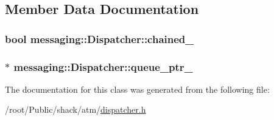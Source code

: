 \subsection{Member Data Documentation}
\hypertarget{classmessaging_1_1Dispatcher_a4db2da2c17f91e2c9b119b60fe4fee0a}{
\subsubsection[{chained\-\_\-}]{\setlength{\rightskip}{0pt plus 5cm}bool messaging\-::\-Dispatcher\-::chained\-\_\-\hspace{0.3cm}{\ttfamily [private]}}}\label{classmessaging_1_1Dispatcher_a4db2da2c17f91e2c9b119b60fe4fee0a}
\hypertarget{classmessaging_1_1Dispatcher_a877e071792b0e42b46c7d32836de0739}{
\subsubsection[{queue\-\_\-ptr\-\_\-}]{$\ast$ messaging\-::\-Dispatcher\-::queue\-\_\-ptr\-\_\-\hspace{0.3cm}{\ttfamily [private]}}}\label{classmessaging_1_1Dispatcher_a877e071792b0e42b46c7d32836de0739}


The documentation for this class was generated from the following file\-:\begin{DoxyCompactItemize}
\item 
/root/\-Public/shack/atm/\hyperlink{dispatcher_8h}{dispatcher.\-h}\end{DoxyCompactItemize}
